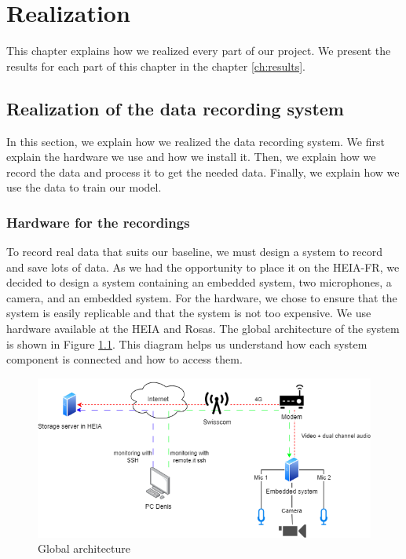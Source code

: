 \chapter{Realization}
\label{ch:setup}

This chapter explains how we realized every part of our project. We present the results for each part of this chapter in the chapter \ref{ch:results}.

\section{Realization of the data recording system}

In this section, we explain how we realized the data recording system. We first explain the hardware we use and how we install it. Then, we explain how we record the data and process it to get the needed data. Finally, we explain how we use the data to train our model.

\subsection{Hardware for the recordings}
To record real data that suits our baseline, we must design a system to record and save lots of data. As we had the opportunity to place it on the HEIA-FR, we decided to design a system containing an embedded system, two microphones, a camera, and an embedded system. For the hardware, we chose to ensure that the system is easily replicable and that the system is not too expensive. We use hardware available at the HEIA and Rosas. The global architecture of the system is shown in Figure \ref{fig:global_architecture}. This diagram helps us understand how each system component is connected and how to access them.

\begin{figure}[H]
    \centering
    \includegraphics[width=1\textwidth]{../Images/real_data_recording_system.drawio.png}
    \caption{Global architecture}
    \label{fig:global_architecture}
\end{figure}

